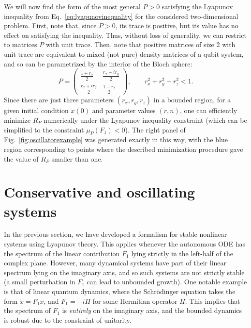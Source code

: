 \documentclass[superscriptaddress,onecolumn,nofootinbib,longbibliography,a4paper,accepted=2026-09-29]{quantumarticle}
\theoremstyle{plain}
\theoremstyle{definition}
\numberwithin{thm}{section}
\numberwithin{assumption}{section}
\numberwithin{lemma}{section}
\numberwithin{prop}{section}
\numberwithin{cor}{section}
\numberwithin{definition}{section}
\numberwithin{rmk}{section}
\numberwithin{equation}{section}
\begin{document}
We will now find the form of the most general $P>0$ satisfying the Lyapunov inequality from Eq.~\eqref{eq:lyapunovinequality} for the considered two-dimensional problem. First, note that, since $P>0$, its trace is positive, but its value has no effect on satisfying the inequality. Thus, without loss of generality, we can restrict to matrices $P$ with unit trace. Then, note that positive matrices of size 2 with unit trace are equivalent to mixed (not pure) density matrices of a qubit system, and so can be parametrized by the interior of the Bloch sphere:
\begin{equation}
    P = \begin{pmatrix}
        \frac{1+r_z}{2} & \frac{r_x-i r_y}{2}\\[1ex]
        \frac{r_x+i r_y}{2} & \frac{1-r_z}{2}
    \end{pmatrix},\qquad r_x^2+r_y^2+r_z^2 < 1.
\end{equation}
Since there are just three parameters $(r_x,r_y,r_z)$ in a bounded region, for a given initial condition $x(0)$ and parameter values $(r,n)$, one can efficiently minimize $R_P$ numerically under the Lyapunov inequality constraint (which can be simplified to the constraint $\mu_P(F_1)<0$). The right panel of Fig.~\ref{fig:oscillatorexample} was generated exactly in this way, with the blue region corresponding to points where the described minimization procedure gave the value of $R_P$ smaller than one.

\newpage 

\section{Conservative and oscillating systems}
\label{sec:conservative}

In the previous section, we have developed a formalism for stable nonlinear systems using Lyapunov theory. This applies whenever the autonomous ODE has the spectrum of the linear contribution $F_1$ lying strictly in the left-half of the complex plane. However, many dynamical systems have part of their linear spectrum lying on the imaginary axis, and so such systems are not strictly stable (a small perturbation in $F_1$ can lead to unbounded growth). One notable example is that of linear quantum dynamics, where the Schr\"{o}dinger equation takes the form $\dot{x} = F_1x$, and $F_1 = -i H$ for some Hermitian operator $H$. This implies that the spectrum of $F_1$ is \emph{entirely} on the imaginary axis, and the bounded dynamics is robust due to the constraint of unitarity.
\end{document}
